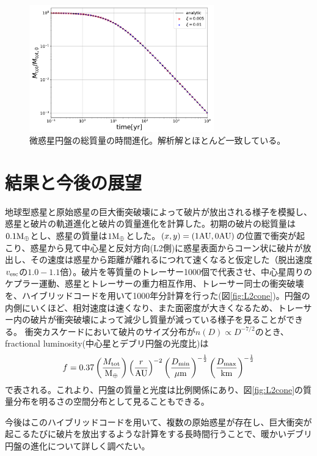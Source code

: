 \documentclass[a4paper,10pt,oneside,twocolumn,notitlepage,final]{jarticle}
\begin{document}
\begin{figure}[h]
 \centering
 \includegraphics[width=8cm]{MassDepletion.pdf}
 \caption{微惑星円盤の総質量の時間進化。解析解とほとんど一致している。\label{fig:Frag}}
\end{figure}

\section{結果と今後の展望}
地球型惑星と原始惑星の巨大衝突破壊によって破片が放出される様子を模擬し、惑星と破片の軌道進化と破片の質量進化を計算した。初期の破片の総質量は$0.1 {\rm M_{\oplus}}$とし、惑星の質量は$1 {\rm M_{\oplus}}$とした。$(x,y) = (1 {\rm AU},0 {\rm AU})$の位置で衝突が起こり、惑星から見て中心星と反対方向(L2側)に惑星表面からコーン状に破片が放出し、その速度は惑星から距離が離れるにつれて速くなると仮定した（脱出速度$v_{\rm esc}$の$1.0-1.1$倍）。破片を等質量のトレーサー1000個で代表させ、中心星周りのケプラー運動、惑星とトレーサーの重力相互作用、トレーサー同士の衝突破壊を、ハイブリッドコードを用いて1000年分計算を行った(図\ref{fig:L2cone})。円盤の内側にいくほど、相対速度は速くなり、また面密度が大きくなるため、トレーサー内の破片が衝突破壊によって減少し質量が減っている様子を見ることができる。
衝突カスケードにおいて破片のサイズ分布が$n(D) \propto D^{-7/2}$のとき、fractional luminosity(中心星とデブリ円盤の光度比)は
\begin{align}
 f = 0.37 \left(\frac{M_{\rm tot}}{\rm M_{\oplus}}\right) \left(\frac{r}{\rm AU}\right)^{-2} \left(\frac{D_{\rm min}}{\rm \mu m}\right)^{-\frac{1}{2}} \left(\frac{D_{\rm max}}{\rm km}\right)^{-\frac{1}{2}}
\end{align}
で表される\citep{Jackson2012}。これより、円盤の質量と光度は比例関係にあり、図\ref{fig:L2cone}の質量分布を明るさの空間分布として見ることもできる。

今後はこのハイブリッドコードを用いて、複数の原始惑星が存在し、巨大衝突が起こるたびに破片を放出するような計算をする長時間行うことで、暖かいデブリ円盤の進化について詳しく調べたい。
\end{document}
